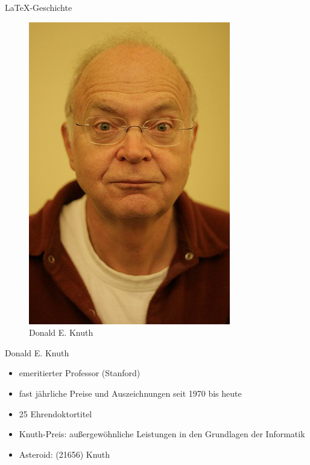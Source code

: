 \begin{frame}{\LaTeX-Geschichte}
\begin{figure}[htbp]
\centering
\includegraphics[width=\textwidth*0.8,height=\textheight*0.8,keepaspectratio]{../img/knuth.jpg}
\caption{Donald E. Knuth}
\end{figure}

\end{frame}

\begin{frame}{Donald E. Knuth}

\begin{itemize}
\itemsep1pt\parskip0pt
\item
  emeritierter Professor (Stanford)
\item
  fast jährliche Preise und Auszeichnungen seit 1970 bis heute
\item
  25 Ehrendoktortitel
\item
  Knuth-Preis: außergewöhnliche Leistungen in den Grundlagen der
  Informatik
\item
  Asteroid: (21656) Knuth
\end{itemize}

\end{frame}

